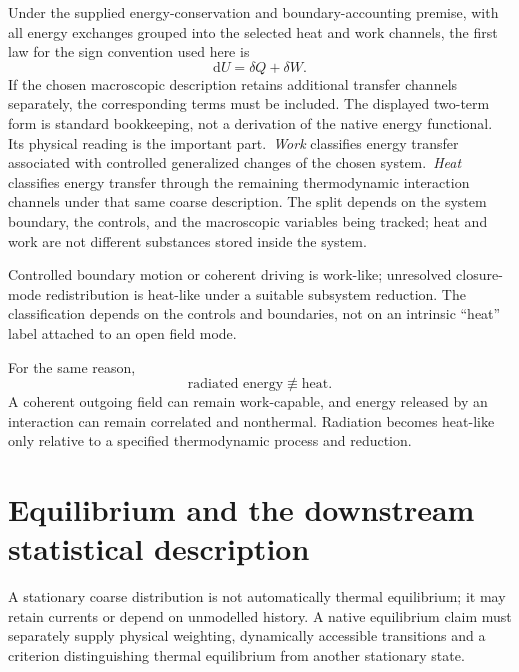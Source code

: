 \documentclass[11pt]{article}
\theoremstyle{definition}
\newcommand{\dd}{\mathrm{d}}
\begin{document}
Under the supplied energy-conservation and boundary-accounting premise, with all
energy exchanges grouped into the selected heat and work channels, the first law
for the sign convention used here is
\begin{equation}
  \boxed{\dd U=\delta Q+\delta W.}
  \label{eq:first-law}
\end{equation}
If the chosen macroscopic description retains additional transfer channels separately,
the corresponding terms must be included.  The displayed two-term form is standard
bookkeeping, not a derivation of the native energy functional.  Its physical reading
is the important part.\ \emph{Work}
classifies energy transfer associated with controlled generalized changes of the chosen
system.\ \emph{Heat} classifies energy transfer through the remaining thermodynamic
interaction channels under that same coarse description.  The split depends on the
system boundary, the controls, and the macroscopic variables being tracked; heat and
work are not different substances stored inside the system.

Controlled boundary motion or coherent driving is work-like; unresolved
closure-mode redistribution is heat-like under a suitable subsystem reduction.
The classification depends on the controls and boundaries, not on an intrinsic
``heat'' label attached to an open field mode.

For the same reason,
\begin{equation}
  \boxed{\text{radiated energy}\not\equiv\text{heat}.}
  \label{eq:radiation-not-heat}
\end{equation}
A coherent outgoing field can remain work-capable, and energy released by an interaction
can remain correlated and nonthermal.  Radiation becomes heat-like only relative to a
specified thermodynamic process and reduction.

\section{Equilibrium and the downstream statistical description}
\label{sec:controls}
A stationary coarse distribution is not automatically thermal equilibrium;
it may retain currents or depend on unmodelled history.  A native equilibrium
claim must separately supply physical weighting, dynamically accessible
transitions and a criterion distinguishing thermal equilibrium from another
stationary state.
\end{document}
